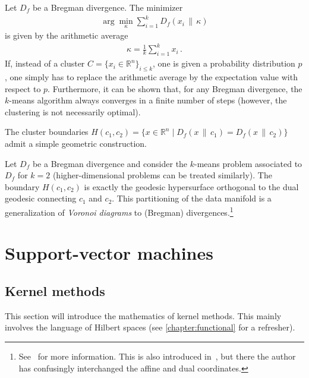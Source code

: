     \begin{property}
        Let $D_f$ be a Bregman divergence. The minimizer
        \begin{gather}
            \arg\min_\kappa\sum_{i=1}^kD_f(x_i\,\|\,\kappa)
        \end{gather}
        is given by the arithmetic average
        \begin{gather}
            \kappa = \frac{1}{k}\sum_{i=1}^kx_i\,.
        \end{gather}
        If, instead of a cluster $C=\{x_i\in\mathbb{R}^n\}_{i\leq k}$, one is given a probability distribution $p$, one simply has to replace the arithmetic average by the expectation value with respect to $p$. Furthermore, it can be shown that, for any Bregman divergence, the $k$-means algorithm always converges in a finite number of steps (however, the clustering is not necessarily optimal).
    \end{property}

    The cluster boundaries $H(c_1, c_2)=\{x\in\mathbb{R}^n\mid D_f(x\,\|\,c_1)=D_f(x\,\|\,c_2)\}$ admit a simple geometric construction.
    \begin{property}
        Let $D_f$ be a Bregman divergence and consider the $k$-means problem associated to $D_f$ for $k=2$ (higher-dimensional problems can be treated similarly). The boundary $H(c_1,c_2)$ is exactly the geodesic hypersurface orthogonal to the dual geodesic connecting $c_1$ and $c_2$. This partitioning of the data manifold is a generalization of \textit{Voronoi diagrams} to (Bregman) divergences.\footnote{See~\citet{boissonnat_bregman_2010} for more information. This is also introduced in~\citet{amari_information_2016}, but there the author has confusingly interchanged the affine and dual coordinates.}
    \end{property}

\section{Support-vector machines}
\subsection{Kernel methods}\label{data:kernel_methods}

    This section will introduce the mathematics of kernel methods. This mainly involves the language of Hilbert spaces (see \cref{chapter:functional} for a refresher).

